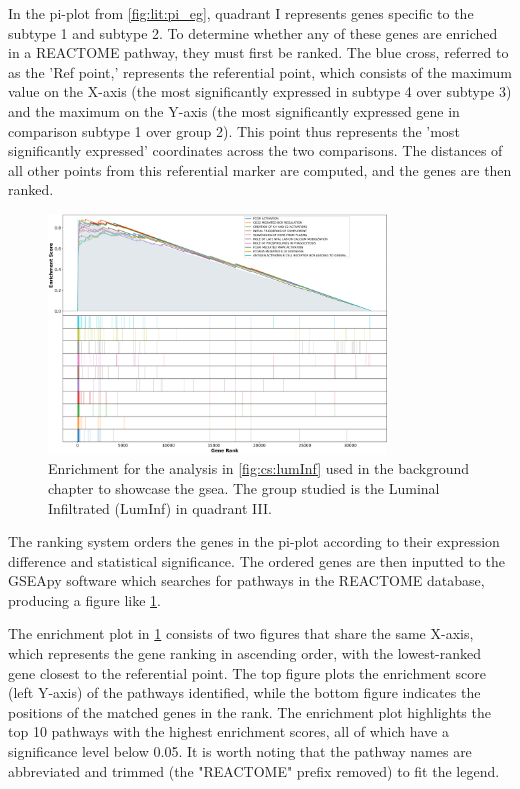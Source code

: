 In the pi-plot from \cref{fig:lit:pi_eg}, quadrant I represents genes specific to the subtype 1 and subtype 2. To determine whether any of these genes are enriched in a REACTOME pathway, they must first be ranked. The blue cross, referred to as the 'Ref point,' represents the referential point, which consists of the maximum value on the X-axis (the most significantly expressed in subtype 4 over subtype 3) and the maximum on the Y-axis (the most significantly expressed gene in comparison subtype 1 over group 2). This point thus represents the 'most significantly expressed' coordinates across the two comparisons. The distances of all other points from this referential marker are computed, and the genes are then ranked. 


\begin{figure}[!t]
    \centering
    \includegraphics[width=0.8\textwidth, keepaspectratio]{Sections/ClusteringAnalysis/Resources/discussion/other_groups/lumInf_reactome_10_top.png}
    \caption[Example - GSEA plot]{Enrichment for the analysis in \cref{fig:cs:lumInf} used in the background chapter to showcase the \acrshort{gsea}. The group studied is the Luminal Infiltrated (LumInf) in quadrant III.}
    \label{fig:lit:gsea_eg}
\end{figure}

The ranking system orders the genes in the pi-plot according to their expression difference and statistical significance. The ordered genes are then inputted to the GSEApy software which searches for pathways in the REACTOME database, producing a figure like \cref{fig:lit:gsea_eg}. 

The enrichment plot in \cref{fig:lit:gsea_eg} consists of two figures that share the same X-axis, which represents the gene ranking in ascending order, with the lowest-ranked gene closest to the referential point. The top figure plots the enrichment score (left Y-axis) of the pathways identified, while the bottom figure indicates the positions of the matched genes in the rank. The enrichment plot highlights the top 10 pathways with the highest enrichment scores, all of which have a significance level below 0.05. It is worth noting that the pathway names are abbreviated and trimmed (the "REACTOME" prefix removed) to fit the legend.

